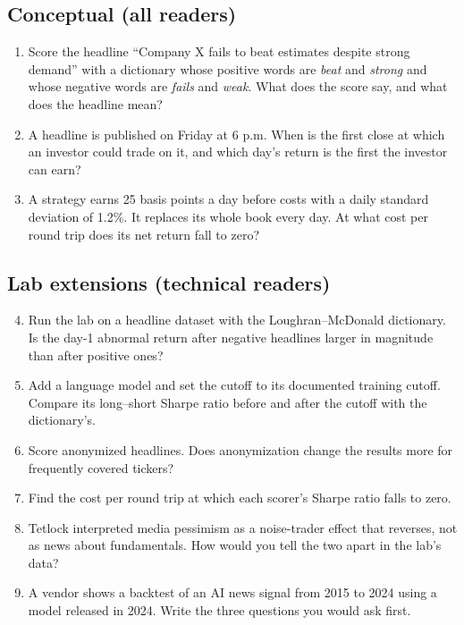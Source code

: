 \subsection*{Conceptual (all readers)}

\begin{enumerate}
  \item Score the headline ``Company X fails to beat estimates despite strong demand'' with a dictionary whose positive words are \emph{beat} and \emph{strong} and whose negative words are \emph{fails} and \emph{weak}. What does the score say, and what does the headline mean?
  \item A headline is published on Friday at 6 p.m. When is the first close at which an investor could trade on it, and which day's return is the first the investor can earn?
  \item A strategy earns 25 basis points a day before costs with a daily standard deviation of 1.2\%. It replaces its whole book every day. At what cost per round trip does its net return fall to zero?
\end{enumerate}

\subsection*{Lab extensions (technical readers)}

\begin{enumerate}
  \setcounter{enumi}{3}
  \item Run the lab on a headline dataset with the Loughran--McDonald dictionary. Is the day-1 abnormal return after negative headlines larger in magnitude than after positive ones?
  \item Add a language model and set the cutoff to its documented training cutoff. Compare its long--short Sharpe ratio before and after the cutoff with the dictionary's.
  \item Score anonymized headlines. Does anonymization change the results more for frequently covered tickers?
  \item Find the cost per round trip at which each scorer's Sharpe ratio falls to zero.
  \item Tetlock interpreted media pessimism as a noise-trader effect that reverses, not as news about fundamentals. How would you tell the two apart in the lab's data?
  \item A vendor shows a backtest of an AI news signal from 2015 to 2024 using a model released in 2024. Write the three questions you would ask first.
\end{enumerate}

